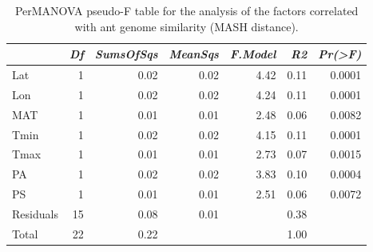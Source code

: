 \begin{table}[ht]
\centering
\begin{tabular}{lrrrrrr}
  \hline
 & {\emph{Df}} & {\emph{SumsOfSqs}} & {\emph{MeanSqs}} & {\emph{F.Model}} & {\emph{R2}} & {\emph{Pr(>F)}} \\ 
  \hline
Lat & 1 & 0.02 & 0.02 & 4.42 & 0.11 & 0.0001 \\ 
  Lon & 1 & 0.02 & 0.02 & 4.24 & 0.11 & 0.0001 \\ 
  MAT & 1 & 0.01 & 0.01 & 2.48 & 0.06 & 0.0082 \\ 
  Tmin & 1 & 0.02 & 0.02 & 4.15 & 0.11 & 0.0001 \\ 
  Tmax & 1 & 0.01 & 0.01 & 2.73 & 0.07 & 0.0015 \\ 
  PA & 1 & 0.02 & 0.02 & 3.83 & 0.10 & 0.0004 \\ 
  PS & 1 & 0.01 & 0.01 & 2.51 & 0.06 & 0.0072 \\ 
  Residuals & 15 & 0.08 & 0.01 &  & 0.38 &  \\ 
  Total & 22 & 0.22 &  &  & 1.00 &  \\ 
   \hline
\end{tabular}
\caption{PerMANOVA pseudo-F table for the analysis of the factors 
correlated with ant genome similarity (MASH distance).} 
\label{tab:perm_mash}
\end{table}
